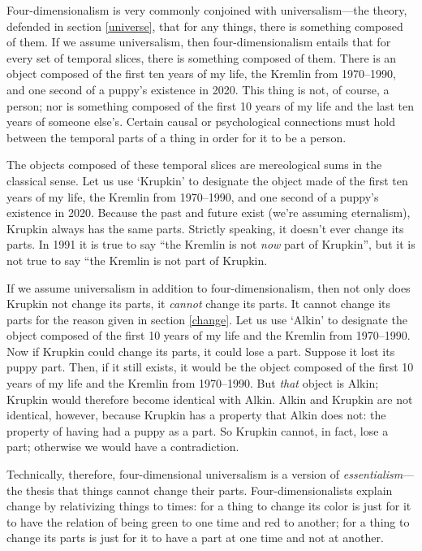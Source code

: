 \documentclass[11pt]{article}
\begin{document}
\begin{spacing}{1.5}
Four-dimensionalism is very commonly conjoined with universalism---the
theory, defended in section \ref{universe}, that for any things, there
is something composed of them.  If we assume universalism, then
four-dimensionalism entails that for every set of temporal slices,
there is something composed of them.  There is an object composed of
the first ten years of my life, the Kremlin from 1970--1990, and one
second of a puppy's existence in 2020.  This thing is not, of course,
a person; nor is something composed of the first 10 years of my life
and the last ten years of someone else's.  Certain causal or
psychological connections must hold between the temporal parts of a
thing in order for it to be a person.

The objects composed of these temporal slices are mereological sums in
the classical sense.  Let us use `Krupkin' to designate the object
made of the first ten years of my life, the Kremlin from 1970--1990,
and one second of a puppy's existence in 2020.  Because the past and
future exist (we're assuming eternalism), Krupkin always has the same
parts.  Strictly speaking, it doesn't ever change its parts.  In 1991
it is true to say ``the Kremlin is not {\em now} part of Krupkin'',
but it is not true to say ``the Kremlin is not part of Krupkin.

If we assume universalism in addition to four-dimensionalism, then not
only does Krupkin not change its parts, it {\em cannot} change its
parts.  It cannot change its parts for the reason given in section
\ref{change}.  Let us use `Alkin' to designate the object composed of
the first 10 years of my life and the Kremlin from 1970--1990.  Now if
Krupkin could change its parts, it could lose a part.  Suppose it lost
its puppy part.  Then, if it still exists, it would be the object
composed of the first 10 years of my life and the Kremlin from
1970--1990.  But {\em that} object is Alkin; Krupkin would therefore
become identical with Alkin.  Alkin and Krupkin are not identical,
however, because Krupkin has a property that Alkin does not: the
property of having had a puppy as a part.  So Krupkin cannot, in fact,
lose a part; otherwise we would have a contradiction.

Technically, therefore, four-dimensional universalism is a version of
{\em essentialism}---the thesis that things cannot change their parts.
Four-dimensionalists explain change by relativizing things to times:
for a thing to change its color is just for it to have the relation of
being green to one time and red to another; for a thing to change its
parts is just for it to have a part at one time and not at another.


\end{spacing}
\end{document}
